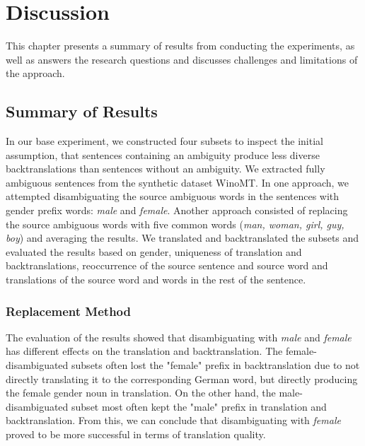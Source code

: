 \chapter{Discussion}
\label{ch:Discussion}

This chapter presents a summary of results from conducting the experiments, as well as answers the research questions and discusses challenges and limitations of the approach. 


\section{Summary of Results}
\label{sec:Discussion:Summary}

In our base experiment, we constructed four subsets to inspect the initial assumption, that sentences containing an ambiguity produce less diverse backtranslations than sentences without an ambiguity. We extracted fully ambiguous sentences from the synthetic dataset WinoMT. In one approach, we attempted disambiguating the source ambiguous words in the sentences with gender prefix words: \textit{male} and \textit{female}. Another approach consisted of replacing the source ambiguous words with five common words (\textit{man, woman, girl, guy, boy}) and averaging the results. We translated and backtranslated the subsets and evaluated the results based on gender, uniqueness of translation and backtranslations, reoccurrence of the source sentence and source word and translations of the source word and words in the rest of the sentence.

\subsection{Replacement Method} %
The evaluation of the results showed that disambiguating with \textit{male} and \textit{female} has different effects on the translation and backtranslation. The female-disambiguated subsets often lost the "female" prefix in backtranslation due to not directly translating it to the corresponding German word, but directly producing the female gender noun in translation. On the other hand, the male-disambiguated subset most often kept the "male" prefix in translation and backtranslation. From this, we can conclude that disambiguating with \textit{female} proved to be more successful in terms of translation quality.

